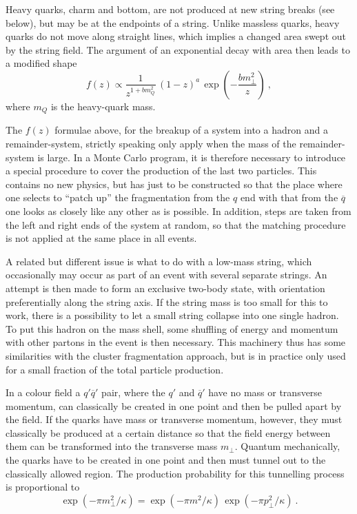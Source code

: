 Heavy quarks, \ie charm and bottom, are not produced at new string 
breaks (see below), but may be at the endpoints of a string. 
Unlike massless quarks, heavy quarks
do not move along straight lines, which implies a
changed area swept out by the string field. The argument of an 
exponential decay with area then leads to a modified shape 
\cite{Bowler:1981sb}
\begin{equation}
f(z) \propto \frac{1}{z^{1 + b m_Q^2}} \, (1 - z)^a \, 
\exp\left( - \frac{b m_{\perp}^2}{z} \right) ~,
\label{eq:stringfzsheavy}
\end{equation}
where $m_Q$ is the heavy-quark mass. 

The $f(z)$ formulae above, for the breakup of a system into a hadron and
a remainder-system, strictly speaking only apply when the mass of the
remainder-system is large. In a Monte Carlo program, it is therefore
necessary to introduce a special procedure to cover the production of
the last two particles. This contains no new physics, but has just to be
constructed so that the place where one selects to ``patch up'' the
fragmentation from the $q$ end with that from the $\overline{q}$ one 
looks as closely like any other as is possible. In addition, steps 
are taken from the left and right ends of the system at random, so that 
the matching procedure is not applied at the same place in all events.

A related but different issue is what to do with a low-mass string,
which occasionally may occur as part of an event with several separate 
strings. An attempt is then made to form an exclusive two-body state, 
with orientation preferentially along the string axis. If the string mass
is too small for this to 
work, there is a possibility to let a small string collapse into one 
single hadron. To put this hadron on the mass shell, some shuffling of 
energy and momentum with other partons in the event is then necessary. 
This machinery thus has some similarities with the cluster fragmentation 
approach, but is in practice only used for a small fraction of the
total particle production.  

In a colour field a $q'\overline{q}'$ pair, where the
$q'$ and $\overline{q}'$ have no mass or transverse momentum, 
can classically be created in one point and then be pulled apart 
by the field. If the quarks have mass or transverse momentum, 
however, they must classically
be produced at a certain distance so that the field energy between
them can be transformed into the transverse mass $m_{\perp}$. Quantum
mechanically, the quarks have to be created in one point and then 
must tunnel out to the classically allowed region. The production 
probability for this tunnelling process is proportional to
\begin{equation}
\exp( -\pi m_{\perp}^2 / \kappa) =  \exp( -\pi m^2 / \kappa) \,
\exp( -\pi p_{\perp}^2 / \kappa) ~.
\label{eq:stringtunnel}
\end{equation}
  
